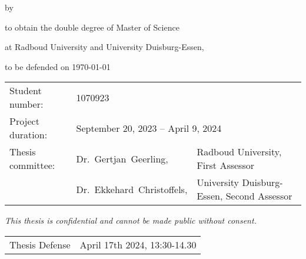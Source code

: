 \begin{titlepage}

\begin{center}

{\makeatletter
\largetitlestyle\fontsize{40}{40}\selectfont\@title
\makeatother}

{\makeatletter
\ifdefvoid{\@subtitle}{}{\bigskip\titlestyle\fontsize{20}{20}\selectfont\@subtitle}
\makeatother}

\bigskip
\bigskip

by

\bigskip
\bigskip

{\makeatletter
\largetitlestyle\fontsize{20}{20}\selectfont\@author
\makeatother}

\bigskip
\bigskip

to obtain the double degree of Master of Science

at Radboud University and University Duisburg-Essen,

to be defended on {\today}

\vfill

\begin{tabular}{lll}
    Student number: & 1070923 \\
    Project duration: & \multicolumn{2}{l}{September 20, 2023 -- April 9, 2024} \\
    Thesis committee: & Dr.\ Gertjan\ Geerling, & Radboud University, First Assessor \\
        & Dr.\ Ekkehard\ Christoffels, & University Duisburg-Essen, Second Assessor \\
   
\end{tabular}

\bigskip
\bigskip
\emph{This thesis is confidential and cannot be made public without consent.}

\bigskip
\bigskip
\begin{tabular}{p{15mm}p{10cm}}
    Thesis Defense&  April 17th 2024, 13:30-14.30\\
\end{tabular}

\bigskip
\bigskip


\end{center}


\end{titlepage}
